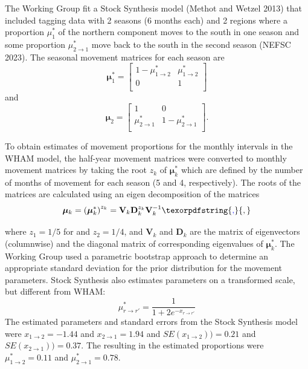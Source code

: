 \documentclass[
]{article}
\providecommand{\DIFaddtex}[1]{{\protect\color{blue}\uwave{#1}}} %
\providecommand{\DIFaddbegin}{} %
\providecommand{\DIFaddend}{} %
\providecommand{\DIFadd}[1]{\texorpdfstring{\DIFaddtex{#1}}{#1}} %
\newcommand{\DIFaddincludegraphics}[2][]{{\color{blue}\fbox{\DIFOincludegraphics[#1]{#2}}}} %
\DeclareRobustCommand{\DIFaddbegin}{\DIFOaddbegin \let\includegraphics\DIFaddincludegraphics} %
\DeclareRobustCommand{\DIFaddend}{\DIFOaddend \let\includegraphics\DIFOincludegraphics} %
\begin{document}
The Working Group fit a Stock Synthesis model (Methot and Wetzel 2013) that included tagging data with 2 seasons (6 months each) and 2 regions where a proportion \(\mu^*_1\) of the northern component moves to the south in one season and some proportion \(\mu^*_{2\rightarrow 1}\) move back to the south in the second season (NEFSC 2023). The seasonal movement matrices for each season are
\begin{equation*}
\boldsymbol{\mu}^*_{1} = 
  \begin{bmatrix}
     1-\mu^*_{1\rightarrow 2} & \mu^*_{1\rightarrow 2} \\
     0 & 1 \\
  \end{bmatrix}
\end{equation*}
and
\begin{equation*}
\boldsymbol{\mu}_{2} = 
  \begin{bmatrix}
     1 &  0 \\
     \mu^*_{2\rightarrow 1} & 1-\mu^*_{2\rightarrow 1} \\
  \end{bmatrix}.
\end{equation*}

To obtain estimates of movement proportions for the monthly intervals in the WHAM model, the half-year movement matrices were converted to monthly movement matrices by taking the root \(z_k\) of \(\boldsymbol{\mu}^*_{k}\) which are defined by the number of months of movement for each season (5 and 4, respectively). The roots of the matrices are calculated using an eigen decomposition of the matrices
\[ \boldsymbol{\mu}_k =  \left(\boldsymbol{\mu}_k^*\right)^{z_k} = \mathbf{V}_k \mathbf{D}_k^{z_k} \mathbf{V}_k^{-1}\DIFaddbegin \DIFadd{,}\DIFaddend \]
where \(z_1 = 1/5\) for and \(z_2 = 1/4\), and \(\mathbf{V}_{k}\) and \(\mathbf{D}_{k}\) are the matrix of eigenvectors (columnwise) and the diagonal matrix of corresponding eigenvalues of \(\boldsymbol{\mu}^*_k\). The Working Group used a parametric bootstrap approach to determine an appropriate standard deviation for the prior distribution for the movement parameters. Stock Synthesis also estimates parameters on a transformed scale, but different from WHAM:
\[\mu^*_{r\rightarrow r'} = \frac{1}{1 + 2e^{-x_{r\rightarrow r'}}}\]
The estimated parameters and standard errors from the Stock Synthesis model were \(x_{1\rightarrow 2}=-1.44\) and \(x_{2\rightarrow 1}=1.94\) and \(SE(x_{1\rightarrow 2})) = 0.21\) and \(SE(x_{2\rightarrow 1})) = 0.37\). The resulting in the estimated proportions were \(\mu^*_{1\rightarrow 2}=0.11\) and \(\mu^*_{2\rightarrow 1}=0.78\).
\end{document}
